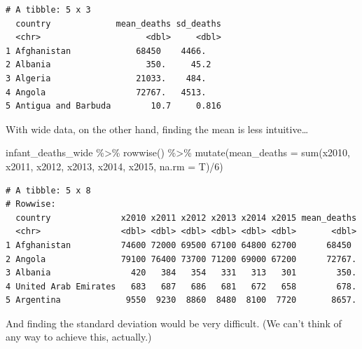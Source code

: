 \documentclass[
  letterpaper,
  DIV=11,
  numbers=noendperiod]{scrreprt}
\newenvironment{Shaded}{\begin{snugshade}}{\end{snugshade}}
\newcommand{\AttributeTok}[1]{\textcolor[rgb]{0.40,0.45,0.13}{#1}}
\newcommand{\DecValTok}[1]{\textcolor[rgb]{0.68,0.00,0.00}{#1}}
\newcommand{\FunctionTok}[1]{\textcolor[rgb]{0.28,0.35,0.67}{#1}}
\newcommand{\NormalTok}[1]{\textcolor[rgb]{0.00,0.23,0.31}{#1}}
\newcommand{\SpecialCharTok}[1]{\textcolor[rgb]{0.37,0.37,0.37}{#1}}
\begin{document}
\begin{verbatim}
# A tibble: 5 x 3
  country             mean_deaths sd_deaths
  <chr>                     <dbl>     <dbl>
1 Afghanistan             68450    4466.   
2 Albania                   350.     45.2  
3 Algeria                 21033.    484.   
4 Angola                  72767.   4513.   
5 Antigua and Barbuda        10.7     0.816
\end{verbatim}

With wide data, on the other hand, finding the mean is less
intuitive\ldots{}

\begin{Shaded}
\begin{Highlighting}[]
\NormalTok{infant\_deaths\_wide }\SpecialCharTok{\%\textgreater{}\%} 
  \FunctionTok{rowwise}\NormalTok{() }\SpecialCharTok{\%\textgreater{}\%} 
  \FunctionTok{mutate}\NormalTok{(}\AttributeTok{mean\_deaths =} \FunctionTok{sum}\NormalTok{(x2010, x2011, x2012, }
\NormalTok{                           x2013, x2014, x2015, }\AttributeTok{na.rm =}\NormalTok{ T)}\SpecialCharTok{/}\DecValTok{6}\NormalTok{) }
\end{Highlighting}
\end{Shaded}

\begin{verbatim}
# A tibble: 5 x 8
# Rowwise: 
  country              x2010 x2011 x2012 x2013 x2014 x2015 mean_deaths
  <chr>                <dbl> <dbl> <dbl> <dbl> <dbl> <dbl>       <dbl>
1 Afghanistan          74600 72000 69500 67100 64800 62700      68450 
2 Angola               79100 76400 73700 71200 69000 67200      72767.
3 Albania                420   384   354   331   313   301        350.
4 United Arab Emirates   683   687   686   681   672   658        678.
5 Argentina             9550  9230  8860  8480  8100  7720       8657.
\end{verbatim}

And finding the standard deviation would be very difficult. (We can't
think of any way to achieve this, actually.)
\end{document}
